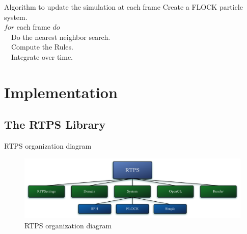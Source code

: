\documentclass[red]{beamer}
\begin{document}
\begin{frame}{Algorithm to update the simulation at each frame}
		\alert<1>{Create a FLOCK particle system.}	\\
		\alert<2>{$for$ each frame $do$}			\\
		\alert<3>{~~Do the nearest neighbor search.}	\\
		\alert<4>{~~Compute the Rules.}				\\
		\alert<5>{~~Integrate over time.}				\\	
\end{frame}


\section{Implementation}

\subsection{The RTPS Library}

\begin{frame}{RTPS organization diagram}
	\begin{figure}[htbp]
	\begin{center}
	\includegraphics[scale=0.25]{../figures/RTPSdiagramMyrna.pdf}
	\caption{RTPS organization diagram}
	\end{center}
	\end{figure}
\end{frame}
\end{document}
